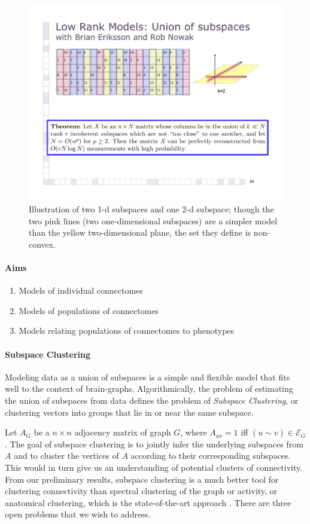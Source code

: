 \documentclass[times,11pt]{article} %
\begin{document}
\begin{figure}
\centering
\includegraphics[width=.4\textwidth]{figs/unionspic}
\caption{\small Illustration of two 1-d subspaces and one 2-d subspace; though the two pink lines (two one-dimensional subspaces) are a simpler model than the yellow two-dimensional plane, the set they define is non-convex.}
\label{fig:unionsum}
\end{figure}

\clearpage
\paragraph{Aims}

\begin{enumerate}
	\item Models of individual connectomes
	\item Models of populations of connectomes
	\item Models relating populations of connectomes to phenotypes
\end{enumerate}



 

\newpage
\paragraph{Subspace Clustering}

Modeling data as a union of subspaces is a simple and flexible model that fits well to the context of brain-graphs.  Algorithmically, the problem of estimating the union of subspaces from data defines the problem of \emph{Subspace Clustering}, or clustering vectors into groups that lie in or near the same subspace. 


Let $A_G$ be a $n \times n$ adjacency matrix of graph $G$, where $A_{uv}=1$ iff $(u \sim v) \in \mathcal{E}_G$. 
The goal of subspace clustering is to jointly infer the underlying subspaces from $A$ and to cluster the vertices of $A$ according to their corresponding subspaces. This would in turn give us an understanding of potential clusters of connectivity. From our preliminary results, subspace clustering is a much better tool for clustering connectivity than spectral clustering of the graph or activity, or anatomical clustering, which is the state-of-the-art approach \cite{}. There are three open problems that we wish to address.
\end{document}
